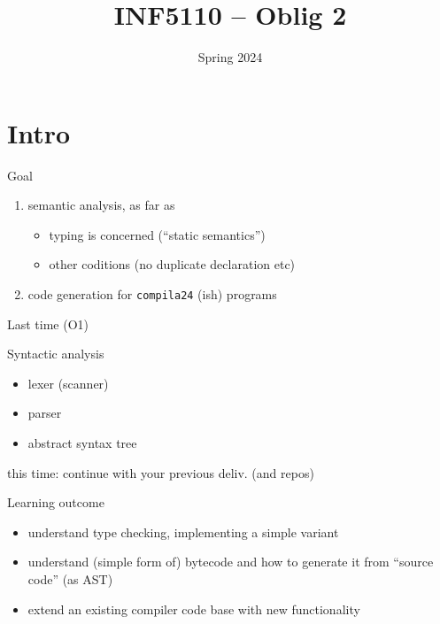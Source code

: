 \documentclass{beamer}
\date{Spring 2024}
\title{INF5110 -- Oblig 2}
\renewcommand{\maketitle}{}
\begin{document}
\maketitle
\section{Intro}
\label{sec:org69ce5b7}
\begin{frame}[label={sec:org8237cf1},fragile]{Goal}
 \begin{enumerate}
\item \alert{semantic  analysis}, as far as 
\begin{itemize}
\item \alert{typing} is concerned (``static semantics'')
\item other coditions (no duplicate declaration etc)
\end{itemize}

\item \alert{code generation} for \texttt{compila24} (ish) programs
\end{enumerate}
\end{frame}
\begin{frame}[label={sec:orgbbb5ed6}]{Last time (O1)}
\begin{block}{Syntactic analysis}
\begin{itemize}
\item lexer (scanner)
\item parser
\item abstract syntax tree
\end{itemize}
\end{block}
\alert{this time}: continue with your previous deliv. (and repos)
\end{frame}
\begin{frame}[label={sec:org266228b}]{Learning outcome}
\begin{itemize}
\item understand type checking, implementing a simple variant
\end{itemize}


\begin{itemize}
\item understand (simple form of) bytecode and how to generate it from ``source
code'' (as AST)

\item extend an existing compiler code base with new functionality
\end{itemize}
\end{frame}
\end{document}
